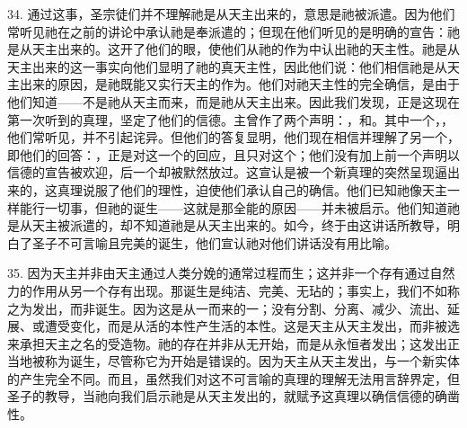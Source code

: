 34. 通过这事，圣宗徒们并不理解祂是从天主出来的，意思是祂被派遣。因为他们常听见祂在之前的讲论中承认祂是奉派遣的；但现在他们听见的是明确的宣告：祂是从天主出来的。这开了他们的眼，使他们从祂的作为中认出祂的天主性。祂是从天主出来的这一事实向他们显明了祂的真天主性，因此他们说：他们相信祂是从天主出来的原因，是祂既能又实行天主的作为。他们对祂天主性的完全确信，是由于他们知道——不是祂从天主而来，而是祂从天主出来。因此我们发现，正是这现在第一次听到的真理，坚定了他们的信德。主曾作了两个声明：，和。其中一个，，他们常听见，并不引起诧异。但他们的答复显明，他们现在相信并理解了另一个，即他们的回答：，正是对这一个的回应，且只对这个；他们没有加上前一个声明以信德的宣告被欢迎，后一个却被默然放过。这宣认是被一个新真理的突然呈现逼出来的，这真理说服了他们的理性，迫使他们承认自己的确信。他们已知祂像天主一样能行一切事，但祂的诞生——这就是那全能的原因——并未被启示。他们知道祂是从天主被派遣的，却不知道祂是从天主出来的。如今，终于由这讲话所教导，明白了圣子不可言喻且完美的诞生，他们宣认祂对他们讲话没有用比喻。\par

35. 因为天主并非由天主通过人类分娩的通常过程而生；这并非一个存有通过自然力的作用从另一个存有出现。那诞生是纯洁、完美、无玷的；事实上，我们不如称之为发出，而非诞生。因为这是从一而来的一；没有分割、分离、减少、流出、延展、或遭受变化，而是从活的本性产生活的本性。这是天主从天主发出，而非被选来承担天主之名的受造物。祂的存在并非从无开始，而是从永恒者发出；这发出正当地被称为诞生，尽管称它为开始是错误的。因为天主从天主发出，与一个新实体的产生完全不同。而且，虽然我们对这不可言喻的真理的理解无法用言辞界定，但圣子的教导，当祂向我们启示祂是从天主发出的，就赋予这真理以确信信德的确凿性。\par

